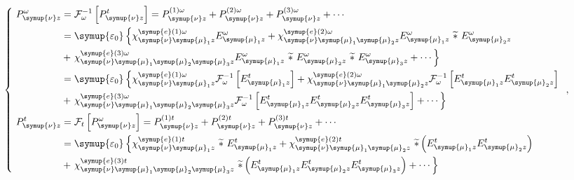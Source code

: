 \begin{equation} \label{eq:2-9}
	\left\{\ \begin{aligned} P^\omega_{{\symup{\nu}} z} &= \mathcal F^{-1}_\omega \left[ P^t_{{\symup{\nu}} z} \right] = P^{(1)\omega}_{{\symup{\nu}} z} + P^{(2)\omega}_{{\symup{\nu}} z} + P^{(3)\omega}_{{\symup{\nu}} z} + \cdots \\ &= {\symup{\varepsilon_0}} \left\{ \chi^{{\symup{e}}(1)\omega}_{{\symup{\nu}} {\symup{\mu}}_1z} E^\omega_{{\symup{\mu}}_1 z} + \chi^{{\symup{e}}(2)\omega}_{{\symup{\nu}} {\symup{\mu}}_1 {\symup{\mu}}_2z} E^\omega_{{\symup{\mu}}_1 z}\ \widetilde *\ E^\omega_{{\symup{\mu}}_2 z} \right. \\  &+ \left. \chi^{{\symup{e}}(3)\omega}_{{\symup{\nu}} {\symup{\mu}}_1 {\symup{\mu}}_2 {\symup{\mu}}_3z} E^\omega_{{\symup{\mu}}_1 z}\ \widetilde *\ E^\omega_{{\symup{\mu}}_2 z}\ \widetilde *\ E^\omega_{{\symup{\mu}}_3 z} + \cdots \right\} \\ &= {\symup{\varepsilon_0}} \left\{ \chi^{{\symup{e}}(1)\omega}_{{\symup{\nu}} {\symup{\mu}}_1z} \mathcal F^{-1}_\omega \left[ E^t_{{\symup{\mu}}_1 z} \right] + \chi^{{\symup{e}}(2)\omega}_{{\symup{\nu}} {\symup{\mu}}_1 {\symup{\mu}}_2z} \mathcal F^{-1}_\omega \left[ E^t_{{\symup{\mu}}_1 z} E^t_{{\symup{\mu}}_2 z} \right] \right. \\ &+ \left. \chi^{{\symup{e}}(3)\omega}_{{\symup{\nu}} {\symup{\mu}}_1 {\symup{\mu}}_2 {\symup{\mu}}_3z} \mathcal F^{-1}_\omega \left[ E^t_{{\symup{\mu}}_1 z} E^t_{{\symup{\mu}}_2 z} E^t_{{\symup{\mu}}_3 z} \right] + \cdots \right\} \\ P^t_{{\symup{\nu}} z} &= \mathcal F_t \left[ P^\omega_{{\symup{\nu}} z} \right] = P^{(1)t}_{{\symup{\nu}} z} + P^{(2)t}_{{\symup{\nu}} z} + P^{(3)t}_{{\symup{\nu}} z} + \cdots \\ &= {\symup{\varepsilon_0}} \left\{ \chi^{{\symup{e}}(1)t}_{{\symup{\nu}} {\symup{\mu}}_1z}\ \widetilde *\ E^t_{{\symup{\mu}}_1 z} + \chi^{{\symup{e}}(2)t}_{{\symup{\nu}} {\symup{\mu}}_1 {\symup{\mu}}_2z}\ \widetilde *\left( E^t_{{\symup{\mu}}_1 z} E^t_{{\symup{\mu}}_2 z} \right) \right. \\ &+ \left. \chi^{{\symup{e}}(3)t}_{{\symup{\nu}} {\symup{\mu}}_1 {\symup{\mu}}_2 {\symup{\mu}}_3z}\ \widetilde *\left( E^t_{{\symup{\mu}}_1 z} E^t_{{\symup{\mu}}_2 z} E^t_{{\symup{\mu}}_3 z} \right) + \cdots \right\} \end{aligned}\right. ~,
\end{equation}
